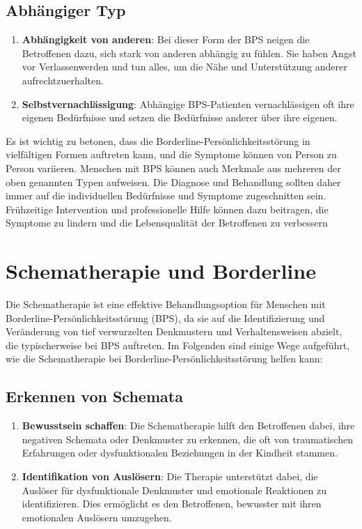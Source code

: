 \subsection{Abhängiger Typ}

\begin{enumerate}
\item \textbf{Abhängigkeit von anderen}: Bei dieser Form der BPS neigen die Betroffenen dazu, sich stark von anderen abhängig zu fühlen. Sie haben Angst vor Verlassenwerden und tun alles, um die Nähe und Unterstützung anderer aufrechtzuerhalten.

\item \textbf{Selbstvernachlässigung}: Abhängige BPS-Patienten vernachlässigen oft ihre eigenen Bedürfnisse und setzen die Bedürfnisse anderer über ihre eigenen.
\end{enumerate}

Es ist wichtig zu betonen, dass die Borderline-Persönlichkeitsstörung in vielfältigen Formen auftreten kann, und die Symptome können von Person zu Person variieren. Menschen mit BPS können auch Merkmale aus mehreren der oben genannten Typen aufweisen. Die Diagnose und Behandlung sollten daher immer auf die individuellen Bedürfnisse und Symptome zugeschnitten sein. Frühzeitige Intervention und professionelle Hilfe können dazu beitragen, die Symptome zu lindern und die Lebensqualität der Betroffenen zu verbessern
\section{Schematherapie und Borderline}

Die Schematherapie ist eine effektive Behandlungsoption für Menschen mit Borderline-Persönlichkeitsstörung (BPS), da sie auf die Identifizierung und Veränderung von tief verwurzelten Denkmustern und Verhaltensweisen abzielt, die typischerweise bei BPS auftreten. Im Folgenden sind einige Wege aufgeführt, wie die Schematherapie bei Borderline-Persönlichkeitsstörung helfen kann:

\subsection{Erkennen von Schemata}

\begin{enumerate}
\item \textbf{Bewusstsein schaffen}: Die Schematherapie hilft den Betroffenen dabei, ihre negativen Schemata oder Denkmuster zu erkennen, die oft von traumatischen Erfahrungen oder dysfunktionalen Beziehungen in der Kindheit stammen.

\item \textbf{Identifikation von Auslösern}: Die Therapie unterstützt dabei, die Auslöser für dysfunktionale Denkmuster und emotionale Reaktionen zu identifizieren. Dies ermöglicht es den Betroffenen, bewusster mit ihren emotionalen Auslösern umzugehen.
\end{enumerate}

